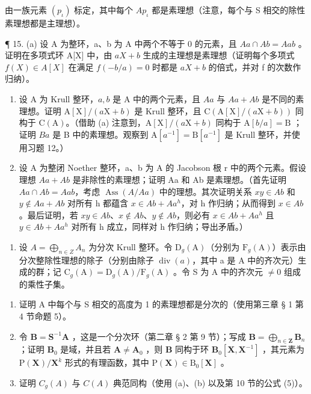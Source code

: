 
由一族元素 \((p_{\iota})\) 标定，其中每个 \(A p_{\iota}\) 都是素理想（注意，每个与 S 相交的除性素理想都是主理想）。

¶ 15. (a) 设 A 为整环，a、b 为 A 中两个不等于 0 的元素，且 \(Aa \cap Ab = Aab\) 。证明在多项式环 A{[}X{]} 中，由 \(aX + b\) 生成的主理想是素理想（证明每个多项式 \(f(X) \in A[X]\) 在满足 \(f(-b/a) = 0\) 时都是 \(aX + b\) 的倍式，并对 f 的次数作归纳）。

\begin{enumerate}
\def\labelenumi{(\alph{enumi})}
\setcounter{enumi}{1}
\item
  设 A 为 Krull 整环，\(a, b\) 是 A 中的两个元素，且 \(Aa\) 与 \(Aa + Ab\) 是不同的素理想。证明 \(\mathrm{A}[\mathrm{X}] / (a\mathrm{X} + b)\) 是 Krull 整环，且 \(\mathrm{C}(\mathrm{A}[\mathrm{X}] / (a\mathrm{X} + b))\) 同构于 \(\mathrm{C}(\mathrm{A})\)。（借助 (a) 注意到，\(\mathrm{A}[\mathrm{X}] / (a\mathrm{X} + b)\) 同构于 \(\mathrm{A}[b / a] = \mathrm{B}\) ；证明 \(Ba\) 是 B 中的素理想。观察到 \(\mathrm{A}[a^{-1}] = \mathrm{B}[a^{-1}]\) 是 Krull 整环，并使用习题 12。）
\item
  设 A 为整闭 Noether 整环，a、b 为 A 的 Jacobson 根 r 中的两个元素。假设理想 \(Aa + Ab\) 是非除性的素理想；证明 Aa 和 Ab 是素理想。（首先证明 \(Aa \cap Ab = Aab\)，考虑 \(\operatorname{Ass}(A/Aa)\) 中的理想。其次证明关系 \(xy \in Ab\) 和 \(y \notin Aa + Ab\) 对所有 h 都蕴含 \(x \in Ab + Aa^{h}\)，对 h 作归纳；从而得到 \(x \in Ab\)。最后证明，若 \(xy \in Ab\)、\(x \notin Ab\)、\(y \notin Ab\)，则必有 \(x \in Ab + Aa^{h}\) 且 \(y \in Ab + Aa^{h}\) 对所有 h 成立，同样对 h 作归纳；导出矛盾。）
\end{enumerate}

\begin{enumerate}
\def\labelenumi{\arabic{enumi}.}
\setcounter{enumi}{15}
\tightlist
\item
  设 \(A = \bigoplus_{n \in Z} A_n\) 为分次 Krull 整环。令 \(\mathrm{D}_g(\mathrm{A})\)（分别为 \(\mathrm{F}_g(\mathrm{A})\)）表示由分次整除性理想的除子（分别由除子 \(\operatorname{div}(a)\)，其中 a 是 A 中的齐次元）生成的群；记 \(\mathrm{C}_g(\mathrm{A}) = \mathrm{D}_g(\mathrm{A}) / \mathrm{F}_g(\mathrm{A})\) 。令 S 为 A 中的齐次元 \(\neq 0\) 组成的乘性子集。
\end{enumerate}

\begin{enumerate}
\def\labelenumi{(\alph{enumi})}
\item
  证明 A 中每个与 S 相交的高度为 1 的素理想都是分次的（使用第三章 § 1 第 4 节命题 5）。
\item
  令 \(\mathbf{B} = \mathbf{S}^{-1}\mathbf{A}\) ，这是一个分次环（第二章 § 2 第 9 节）；写成 \(\mathbf{B} = \bigoplus_{n\in \mathbf{Z}}\mathbf{B}_n\) ；证明 \(\mathbf{B}_0\) 是域，并且若 \(\mathbf{A}\neq \mathbf{A}_0\) ，则 \(\mathbf{B}\) 同构于环 \(\mathbf{B}_0[\mathbf{X},\mathbf{X}^{-1}]\) ，其元素为 \(\mathrm{P}(\mathbf{X}) / \mathbf{X}^k\) 形式的有理函数，其中 \(\mathrm{P}(\mathbf{X})\in \mathrm{B}_0[\mathbf{X}]\) 。
\item
  证明 \(C_{g}(A)\) 与 \(C(A)\) 典范同构（使用 (a)、(b) 以及第 10 节的公式 (5)）。
\end{enumerate}

